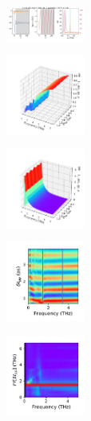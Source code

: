\documentclass[a4paper]{article}
\begin{document}
\begin{figure}[H]
  \centering
  \includegraphics[width=0.23\textwidth]{HL-A0-v2-imp3.pdf}
\end{figure}
\begin{figure}[H]
  \centering
  \includegraphics[width=0.23\textwidth]{cond3d_real-A0-v2-imp3.pdf}
\end{figure}
\begin{figure}[H]
  \centering
  \includegraphics[width=0.23\textwidth]{cond3d_imag-A0-v2-imp3.pdf}
\end{figure}
\begin{figure}[H]
  \centering
  \includegraphics[width=0.23\textwidth]{cond_pcolor-A0-v2-imp3.pdf}
\end{figure}
\begin{figure}[H]
  \centering
  \includegraphics[width=0.23\textwidth]{cond_w_pcolor-A0-v2-imp3.pdf}
\end{figure}
\end{document}

